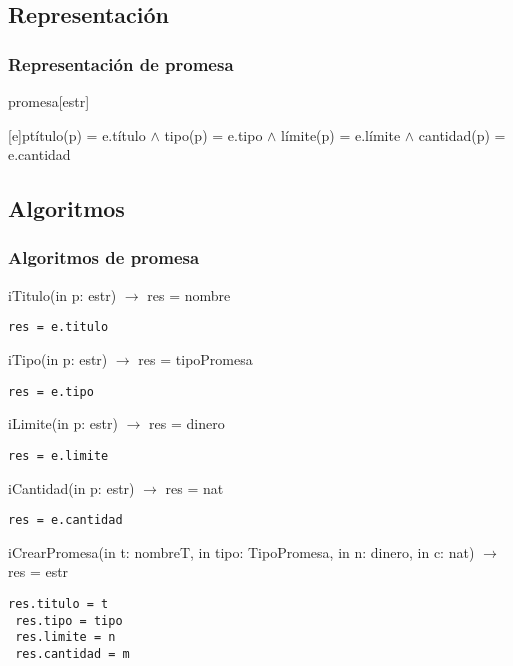 
\subsection{Representaci\'on}
\subsubsection{Representaci\'on de promesa}
\begin{Estructura}{promesa}[estr]
    \begin{Tupla}[estr]
    \end{Tupla}
\end{Estructura}


[e]{p}{t\'itulo(p) = e.t\'itulo $\land$ tipo(p) = e.tipo $\land$ l\'imite(p) = e.l\'imite $\land$ cantidad(p) = e.cantidad}

  \subsection{Algoritmos}
\subsubsection{Algoritmos de promesa}

iTitulo(in p: estr) $\rightarrow$ res = nombre
\begin{lstlisting}[mathescape]
 res = e.titulo
\end{lstlisting}

iTipo(in p: estr) $\rightarrow$ res = tipoPromesa
\begin{lstlisting}[mathescape]
 res = e.tipo
\end{lstlisting}

iLimite(in p: estr) $\rightarrow$ res = dinero
\begin{lstlisting}[mathescape]
 res = e.limite
\end{lstlisting}


iCantidad(in p: estr) $\rightarrow$ res = nat
\begin{lstlisting}[mathescape]
 res = e.cantidad
\end{lstlisting}

iCrearPromesa(in t: nombreT, in tipo: TipoPromesa, in n: dinero, in c: nat) $\rightarrow$ res = estr
\begin{lstlisting}[mathescape]
 res.titulo = t
 res.tipo = tipo
 res.limite = n
 res.cantidad = m
\end{lstlisting}


